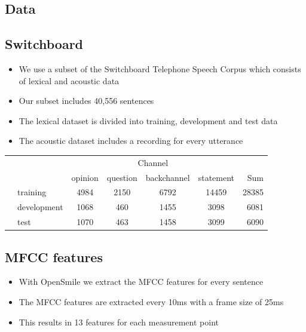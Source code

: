 \documentclass[a0,landscape]{a0poster}
\begin{document}
\begin{multicols}{3}

\color{Black} %
\large

\section*{Data}
\subsection*{Switchboard}

\begin{itemize}
	\item We use a subset of the Switchboard Telephone Speech Corpus which consists of lexical and acoustic data
	\item Our subset includes 40,556 sentences
	\item The lexical dataset is divided into training, development and test data
	\item The acoustic dataset includes a recording for every utterance
\end{itemize}

	\begin{tabular}{ c l| c c c c || r}
		&\multicolumn{1}{c}{} & \multicolumn{4}{c}{Channel} & \\
		& & opinion & question & backchannel & statement & Sum\\
		\cline{2-7}
		{\multirow{3}{2cm}{\centering \rotatebox[origin=c]{90}{Dataset}}}& training & 4984 & 2150 & 6792 & 14459 & 28385\\
		& development & 1068 & 460 & 1455 & 3098 & 6081\\
		& test & 1070 & 463 & 1458 & 3099 & 6090\\
	\end{tabular}

\subsection*{MFCC features}
\begin{itemize}
	\item With OpenSmile we extract the MFCC features for every sentence
	\item The MFCC features are extracted every 10ms with a frame size of 25ms
	\item This results in 13 features for each measurement point
\end{itemize}


\end{multicols}
\end{document}
